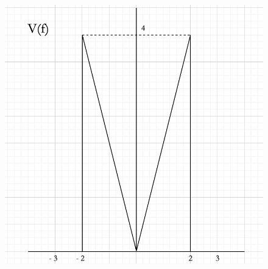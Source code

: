 \documentclass[12pt,a4paper]{article}
\begin{document}
	\begin{figure}[h!]
		\centering
		\includegraphics[scale=0.4]{./images/fourier37.png}
	\end{figure}
	\newpage
\end{document}
